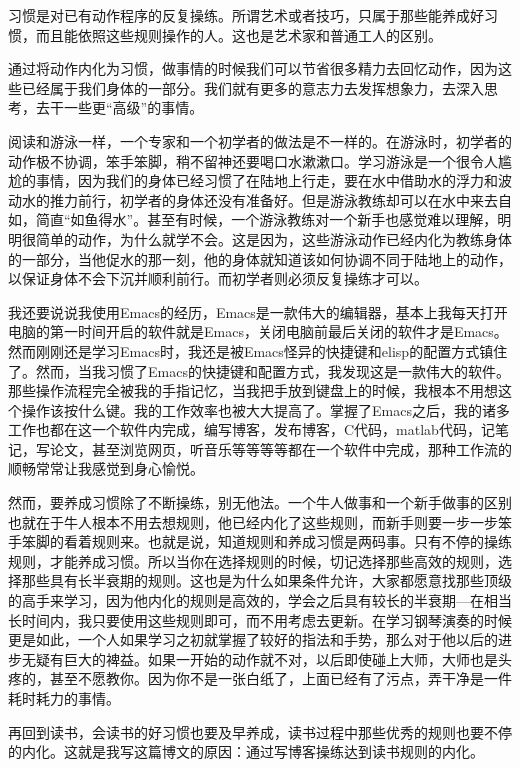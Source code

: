 \documentclass[10pt,a4paper,UTF8]{article}
\begin{document}
习惯是对已有动作程序的反复操练。所谓艺术或者技巧，只属于那些能养成好习惯，而且能依照这些规则操作的人。这也是艺术家和普通工人的区别。

通过将动作内化为习惯，做事情的时候我们可以节省很多精力去回忆动作，因为这些已经属于我们身体的一部分。我们就有更多的意志力去发挥想象力，去深入思考，去干一些更“高级”的事情。

阅读和游泳一样，一个专家和一个初学者的做法是不一样的。在游泳时，初学者的动作极不协调，笨手笨脚，稍不留神还要喝口水漱漱口。学习游泳是一个很令人尴尬的事情，因为我们的身体已经习惯了在陆地上行走，要在水中借助水的浮力和波动水的推力前行，初学者的身体还没有准备好。但是游泳教练却可以在水中来去自如，简直“如鱼得水”。甚至有时候，一个游泳教练对一个新手也感觉难以理解，明明很简单的动作，为什么就学不会。这是因为，这些游泳动作已经内化为教练身体的一部分，当他促水的那一刻，他的身体就知道该如何协调不同于陆地上的动作，以保证身体不会下沉并顺利前行。而初学者则必须反复操练才可以。

我还要说说我使用Emacs的经历，Emacs是一款伟大的编辑器，基本上我每天打开电脑的第一时间开启的软件就是Emacs，关闭电脑前最后关闭的软件才是Emacs。然而刚刚还是学习Emacs时，我还是被Emacs怪异的快捷键和elisp的配置方式镇住了。然而，当我习惯了Emacs的快捷键和配置方式，我发现这是一款伟大的软件。那些操作流程完全被我的手指记忆，当我把手放到键盘上的时候，我根本不用想这个操作该按什么键。我的工作效率也被大大提高了。掌握了Emacs之后，我的诸多工作也都在这一个软件内完成，编写博客，发布博客，C代码，matlab代码，记笔记，写论文，甚至浏览网页，听音乐等等等等都在一个软件中完成，那种工作流的顺畅常常让我感觉到身心愉悦。

然而，要养成习惯除了不断操练，别无他法。一个牛人做事和一个新手做事的区别也就在于牛人根本不用去想规则，他已经内化了这些规则，而新手则要一步一步笨手笨脚的看着规则来。也就是说，知道规则和养成习惯是两码事。只有不停的操练规则，才能养成习惯。所以当你在选择规则的时候，切记选择那些高效的规则，选择那些具有长半衰期的规则。这也是为什么如果条件允许，大家都愿意找那些顶级的高手来学习，因为他内化的规则是高效的，学会之后具有较长的半衰期---在相当长时间内，我只要使用这些规则即可，而不用考虑去更新。在学习钢琴演奏的时候更是如此，一个人如果学习之初就掌握了较好的指法和手势，那么对于他以后的进步无疑有巨大的裨益。如果一开始的动作就不对，以后即使碰上大师，大师也是头疼的，甚至不愿教你。因为你不是一张白纸了，上面已经有了污点，弄干净是一件耗时耗力的事情。


再回到读书，会读书的好习惯也要及早养成，读书过程中那些优秀的规则也要不停的内化。这就是我写这篇博文的原因：通过写博客操练达到读书规则的内化。
\end{document}
